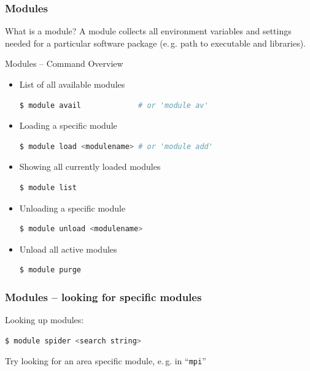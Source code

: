 \begin{frame}
  \frametitle{Modules}
  \vspace{-1.3em}
  \begin{block}{What is a module?}
    A module collects all environment variables and settings needed for a particular software package (e.\,g. path to executable and libraries).
  \end{block}

  \vfill
\end{frame}

\begin{frame}[fragile]
  {Modules -- Command Overview}
  \vspace{-1em}
  \begin{itemize}
    \setlength\itemsep{-0.1em}
  \item List of all available modules
    \begin{lstlisting}[language=Bash, style=Shell]
$ module avail             # or 'module av'
    \end{lstlisting}
  \item Loading a specific module
    \begin{lstlisting}[language=Bash, style=Shell]
$ module load <modulename> # or 'module add'
    \end{lstlisting}
  \item Showing all currently loaded modules
    \begin{lstlisting}[language=Bash, style=Shell]
$ module list
    \end{lstlisting}
  \item Unloading a specific module
    \begin{lstlisting}[language=Bash, style=Shell]
$ module unload <modulename>
    \end{lstlisting}
  \item Unload all active modules
    \begin{lstlisting}[language=Bash, style=Shell]
$ module purge
    \end{lstlisting}
  \end{itemize}
  \vfill
\end{frame}

\begin{frame}[fragile]
  \frametitle{Modules -- looking for specific modules}
  Looking up modules:
  \begin{lstlisting}[language=Bash, style=Shell]
$ module spider <search string>
  \end{lstlisting}
  \pause
  \begin{task}
  	Try looking for an area specific 
    module, e.\,g. in ``\texttt{mpi}''
  \end{task}
\end{frame}

